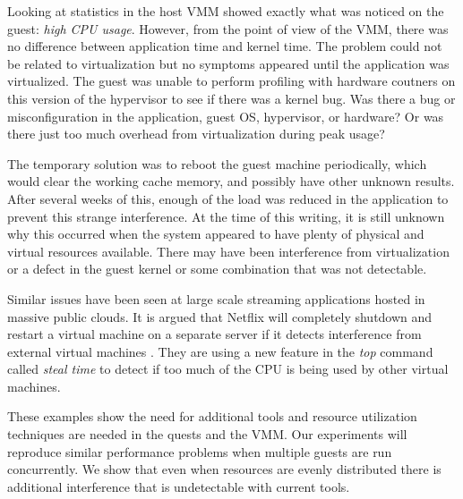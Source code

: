\indent Looking at statistics in the host VMM showed exactly what was noticed on the guest:  \emph{high CPU usage}.   However, from the point of view of the VMM, there was no difference between application time and kernel time.  The problem could not be related to virtualization but no symptoms appeared until the application was virtualized.  The guest was unable to perform profiling with hardware coutners on this version of the hypervisor \cite{serebrin} to see if there was a kernel bug.  Was there a bug or misconfiguration in the application, guest OS, hypervisor, or hardware?  Or was there just too much overhead from virtualization during peak usage? 

\indent The temporary solution was to reboot the guest machine periodically, which would clear the working cache memory, and possibly have other unknown results.  After several weeks of this, enough of the load was reduced in the application to prevent this strange interference.  At the time of this writing, it is still unknown why this occurred when the system appeared to have plenty of physical and virtual resources available. There may have been interference from virtualization or a defect in the guest kernel or some combination that was not detectable. 

\indent Similar issues have been seen at large scale streaming applications hosted in massive public clouds.  
It is argued that Netflix will completely shutdown and restart a virtual machine on a separate server if it detects interference from external virtual machines \cite{netflix}. 
They are using a new feature in the \emph{top} command called \emph{steal time} to detect if too much of the CPU is being used by other virtual machines.

\indent These examples show the need for additional tools and resource utilization techniques are needed in the quests and the VMM.  
Our experiments will reproduce similar performance problems when multiple guests are run concurrently. 
We show that even when resources are evenly distributed there is additional interference that is undetectable with current tools. 

